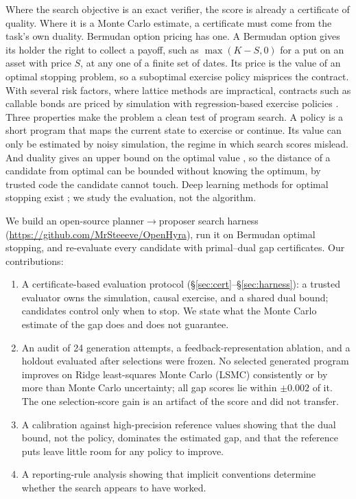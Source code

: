\documentclass{article}
\begin{document}
Where the search objective is an exact verifier, the score is already a certificate of quality. Where it is a Monte Carlo estimate, a certificate must come from the task's own duality. Bermudan option pricing has one. A Bermudan option gives its holder the right to collect a payoff, such as $\max(K - S, 0)$ for a put on an asset with price $S$, at any one of a finite set of dates. Its price is the value of an optimal stopping problem, so a suboptimal exercise policy misprices the contract. With several risk factors, where lattice methods are impractical, contracts such as callable bonds are priced by simulation with regression-based exercise policies \citep{longstaff2001valuing,glasserman2004monte}. Three properties make the problem a clean test of program search. A policy is a short program that maps the current state to exercise or continue. Its value can only be estimated by noisy simulation, the regime in which search scores mislead. And duality gives an upper bound on the optimal value \citep{rogers2002monte,haugh2004pricing,andersen2004primal}, so the distance of a candidate from optimal can be bounded without knowing the optimum, by trusted code the candidate cannot touch. Deep learning methods for optimal stopping exist \citep{becker2019deep}; we study the evaluation, not the algorithm.

We build an open-source planner$\rightarrow$proposer search harness (\url{https://github.com/MrSteeeve/OpenHyra}), run it on Bermudan optimal stopping, and re-evaluate every candidate with primal--dual gap certificates. Our contributions:
\begin{enumerate}\setlength\itemsep{0pt}
\item A certificate-based evaluation protocol (\S\ref{sec:cert}--\S\ref{sec:harness}): a trusted evaluator owns the simulation, causal exercise, and a shared dual bound; candidates control only when to stop. We state what the Monte Carlo estimate of the gap does and does not guarantee.
\item An audit of 24 generation attempts, a feedback-representation ablation, and a holdout evaluated after selections were frozen. No selected generated program improves on Ridge least-squares Monte Carlo (LSMC) consistently or by more than Monte Carlo uncertainty; all gap scores lie within $\pm 0.002$ of it. The one selection-score gain is an artifact of the score and did not transfer.
\item A calibration against high-precision reference values showing that the dual bound, not the policy, dominates the estimated gap, and that the reference puts leave little room for any policy to improve.
\item A reporting-rule analysis showing that implicit conventions determine whether the search appears to have worked.
\end{enumerate}
\end{document}
